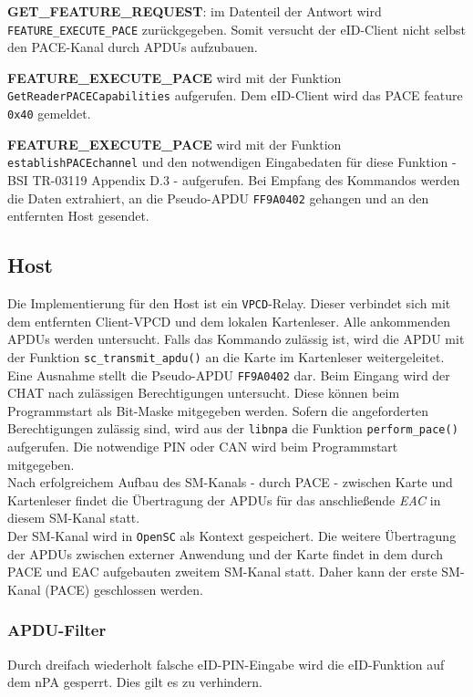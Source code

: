 \documentclass[toc=flat,fontsize=11pt,a4paper,titlepage,headsepline,numbers=noenddot, bibliography=totoc]{scrartcl}
\begin{document}
\textbf{GET\_FEATURE\_REQUEST}: im Datenteil der Antwort wird \verb+FEATURE_EXECUTE_PACE+ zurückgegeben. Somit versucht der
eID-Client nicht selbst den PACE-Kanal durch APDUs aufzubauen.
 
\textbf{FEATURE\_EXECUTE\_PACE} wird mit der Funktion \verb+GetReaderPACECapabilities+ aufgerufen. Dem eID-Client wird das 
PACE feature \verb+0x40+ gemeldet.
 
\textbf{FEATURE\_EXECUTE\_PACE} wird mit der Funktion \verb+establishPACEchannel+ und den notwendigen Eingabedaten für diese Funktion 
- BSI TR-03119 Appendix D.3 - aufgerufen. Bei Empfang des Kommandos werden die Daten extrahiert, an die Pseudo-APDU \texttt{FF9A0402} gehangen und 
an den entfernten Host gesendet.  

\subsection{Host}

Die Implementierung für den Host ist ein \verb+VPCD+-Relay. Dieser verbindet sich mit dem entfernten Client-VPCD und dem lokalen Kartenleser. 
Alle ankommenden APDUs werden untersucht. Falls das Kommando zulässig ist, wird die APDU mit der Funktion  \verb+sc_transmit_apdu()+
an die Karte im Kartenleser weitergeleitet.\\
Eine Ausnahme stellt die Pseudo-APDU \texttt{FF9A0402} dar. Beim Eingang wird der CHAT nach zulässigen Berechtigungen untersucht. Diese können 
beim Programmstart als Bit-Maske mitgegeben werden. Sofern die angeforderten Berechtigungen zulässig sind, wird aus der \verb+libnpa+ die 
Funktion \verb+perform_pace()+ aufgerufen. Die notwendige PIN oder CAN wird beim Programmstart mitgegeben. \\
Nach erfolgreichem Aufbau des SM-Kanals - durch PACE - zwischen Karte und Kartenleser findet die Übertragung der APDUs 
für das anschließende \textit{EAC} in diesem SM-Kanal statt.\\ 
Der SM-Kanal wird in \verb+OpenSC+ als Kontext gespeichert.
Die weitere Übertragung der APDUs zwischen externer Anwendung und der Karte findet in dem durch PACE und EAC aufgebauten zweitem SM-Kanal statt. 
Daher kann der erste SM-Kanal (PACE) geschlossen werden. 

\subsubsection{APDU-Filter}

Durch dreifach wiederholt falsche eID-PIN-Eingabe wird die eID-Funktion auf dem nPA gesperrt. Dies gilt es zu verhindern.
\end{document}
